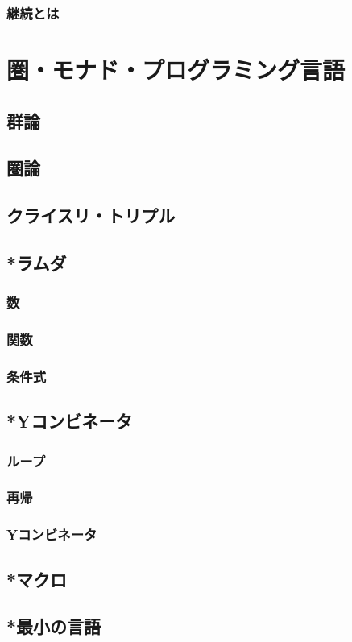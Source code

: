 \documentclass[twocolumn]{jsbook}
\begin{document}
\section{継続とは}




\part{圏・モナド・プログラミング言語}

\chapter{群論}

\chapter{圏論}

\chapter{クライスリ・トリプル}

\chapter{*ラムダ}

\section{数}

\section{関数}

\section{条件式}

\chapter{*Yコンビネータ}

\section{ループ}

\section{再帰}

\section{Yコンビネータ}

\chapter{*マクロ}

\chapter{*最小の言語}
\end{document}
